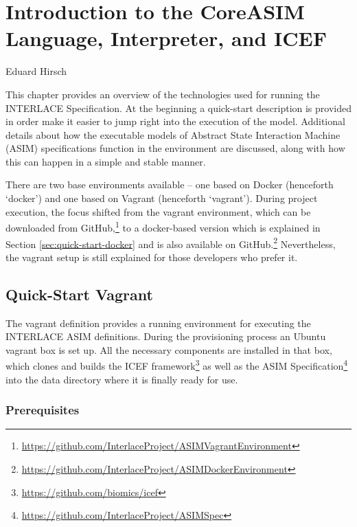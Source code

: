 \chapter{Introduction to the CoreASIM Language, Interpreter, and ICEF}
\label{ch:CoreAsimIntro}

\vspace{-1cm}
\begin{center}
Eduard Hirsch
\end{center}

This chapter provides an overview of the technologies used for running the INTERLACE Specification. At the beginning a quick-start description is provided in order make it easier to jump right into the execution of the model. Additional details about how the executable models of Abstract State Interaction Machine (ASIM) specifications function in the environment are discussed, along with how this can happen in a simple and stable manner.

There are two base environments available -- one based on Docker (henceforth `docker') and one based on Vagrant (henceforth `vagrant'). During project execution, the focus shifted from the vagrant environment, which can be downloaded from GitHub,\footnote{\url{https://github.com/InterlaceProject/ASIMVagrantEnvironment}} to a docker-based version which is explained in Section \ref{sec:quick-start-docker} and is also available on GitHub.\footnote{\url{https://github.com/InterlaceProject/ASIMDockerEnvironment}} Nevertheless, the vagrant setup is still explained for those developers who prefer it.

\section{Quick-Start Vagrant}
\label{sec:quick-start-vagrant}

The vagrant definition provides a running environment for executing the INTERLACE ASIM definitions. During the provisioning process an Ubuntu vagrant box is set up. All the necessary components are installed in that box, which clones and builds the ICEF framework\footnote{\url{https://github.com/biomics/icef}} as well as the ASIM Specification\footnote{\url{https://github.com/InterlaceProject/ASIMSpec}} into the data directory where it is finally ready for use.

\subsection{Prerequisites}

